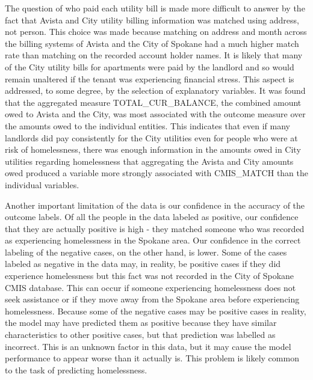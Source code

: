 \documentclass[10pt,letterpaper]{article}
\begin{document}
The question of who paid each utility bill is made more difficult to answer by the fact that Avista and City utility billing information was matched using address, not person. This choice was made because matching on address and month across the billing systems of Avista and the City of Spokane had a much higher match rate than matching on the recorded account holder names. It is likely that many of the City utility bills for apartments were paid by the landlord and so would remain unaltered if the tenant was experiencing financial stress. This aspect is addressed, to some degree, by the selection of explanatory variables. It was found that the aggregated measure TOTAL\_CUR\_BALANCE, the combined amount owed to Avista and the City, was most associated with the outcome measure over the amounts owed to the individual entities. This indicates that even if many landlords did pay consistently for the City utilities even for people who were at risk of homelessness, there was enough information in the amounts owed in City utilities regarding homelessness that aggregating the Avista and City amounts owed produced a variable more strongly associated with CMIS\_MATCH than the individual variables.

Another important limitation of the data is our confidence in the accuracy of the outcome labels. Of all the people in the data labeled as positive, our confidence that they are actually positive is high - they matched someone who was recorded as experiencing homelessness in the Spokane area. Our confidence in the correct labeling of the negative cases, on the other hand, is lower. Some of the cases labeled as negative in the data may, in reality, be positive cases if they did experience homelessness but this fact was not recorded in the City of Spokane CMIS database. This can occur if someone experiencing homelessness does not seek assistance or if they move away from the Spokane area before experiencing homelessness. Because some of the negative cases may be positive cases in reality, the model may have predicted them as positive because they have similar characteristics to other positive cases, but that prediction was labelled as incorrect. This is an unknown factor in this data, but it may cause the model performance to appear worse than it actually is. This problem is likely common to the task of predicting homelessness.
\end{document}
